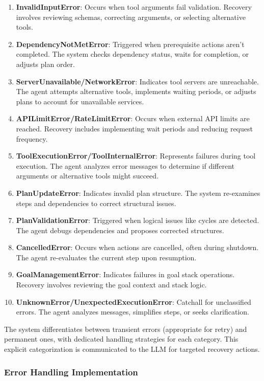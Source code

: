 \documentclass[12pt,a4paper]{article}
\begin{document}
\begin{enumerate}[label=\arabic*.]
    \item \textbf{InvalidInputError}: Occurs when tool arguments fail validation. Recovery involves reviewing schemas, correcting arguments, or selecting alternative tools.
    \item \textbf{DependencyNotMetError}: Triggered when prerequisite actions aren't completed. The system checks dependency status, waits for completion, or adjusts plan order.
    \item \textbf{ServerUnavailable/NetworkError}: Indicates tool servers are unreachable. The agent attempts alternative tools, implements waiting periods, or adjusts plans to account for unavailable services.
    \item \textbf{APILimitError/RateLimitError}: Occurs when external API limits are reached. Recovery includes implementing wait periods and reducing request frequency.
    \item \textbf{ToolExecutionError/ToolInternalError}: Represents failures during tool execution. The agent analyzes error messages to determine if different arguments or alternative tools might succeed.
    \item \textbf{PlanUpdateError}: Indicates invalid plan structure. The system re-examines steps and dependencies to correct structural issues.
    \item \textbf{PlanValidationError}: Triggered when logical issues like cycles are detected. The agent debugs dependencies and proposes corrected structures.
    \item \textbf{CancelledError}: Occurs when actions are cancelled, often during shutdown. The agent re-evaluates the current step upon resumption.
    \item \textbf{GoalManagementError}: Indicates failures in goal stack operations. Recovery involves reviewing the goal context and stack logic.
    \item \textbf{UnknownError/UnexpectedExecutionError}: Catchall for unclassified errors. The agent analyzes messages, simplifies steps, or seeks clarification.
\end{enumerate}

The system differentiates between transient errors (appropriate for retry) and permanent ones, with dedicated handling strategies for each category. This explicit categorization is communicated to the LLM for targeted recovery actions.

\subsubsection*{Error Handling Implementation}
\end{document}
